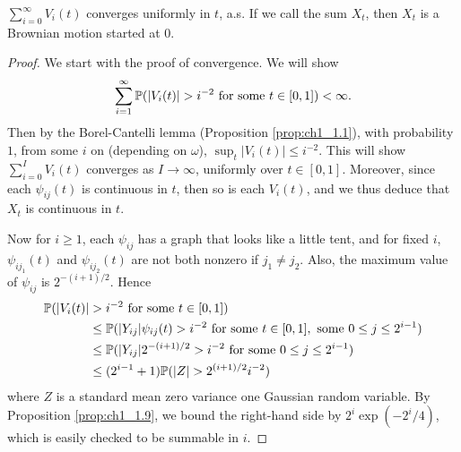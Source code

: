 \begin{theorem}\label{thm:ch1_2.4}
$\sum_{i=0}^\infty V_i(t)$ converges uniformly in $t$, a.s. If we call the sum $X_t$, then $X_t$ is a Brownian motion started at $0$.
\end{theorem}

\begin{proof}
We start with the proof of convergence. We will show
\[
    \sum_{i=1}^{\infty}\P(|V_i(t)| > i^{-2}~\text{for some}~t \in [0,1]) < \infty.
\]
Then by the Borel-Cantelli lemma (Proposition \ref{prop:ch1_1.1}), with probability $1$, from some $i$ on (depending on $\omega$), $\sup_t |V_i(t)| \leq i^{-2}$. This will show $\sum_{i=0}^I V_i(t)$ converges as $I \to \infty$, uniformly over $t \in [0,1]$. Moreover, since each $\psi_{ij}(t)$ is continuous in $t$, then so is each $V_i(t)$, and we thus deduce that $X_t$ is continuous in $t$.

Now for $i \geq 1$, each $\psi_{ij}$ has a graph that looks like a little tent, and for fixed $i$, $\psi_{ij_1}(t)$ and $\psi_{ij_2}(t)$ are not both nonzero if $j_1 \neq j_2$. Also, the maximum value of $\psi_{ij}$ is $2^{-(i+1)/2}$. Hence
\begin{align*}
    \P(|V_i(t)| &> i^{-2}~\text{for some}~t \in [0,1]) \\
    &\leq \P(|Y_{ij}|\psi_{ij}(t) > i^{-2}~\text{for some}~t \in [0,1],~\text{some}~0 \leq j \leq 2^{i-1}) \\
    &\leq \P(|Y_{ij}|2^{-(i+1)/2} > i^{-2}~\text{for some}~0 \leq j \leq 2^{i-1}) \\
    &\leq (2^{i-1} + 1)\P(|Z| > 2^{(i+1)/2}i^{-2})
\end{align*}
where $Z$ is a standard mean zero variance one Gaussian random variable. By Proposition \ref{prop:ch1_1.9}, we bound the right-hand side by $2^i\exp(-2^i/4)$, which is easily checked to be summable in $i$.


\end{proof}
